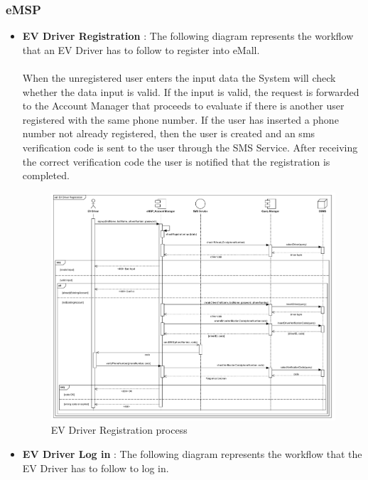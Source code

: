 \subsubsection{eMSP}
\begin{itemize}
    \item \textbf{EV Driver Registration} : The following diagram represents the workflow that an EV Driver has to follow to register into eMall.\\
          \\When the unregistered user enters the input data the System will check whether the data input is valid. If the input is valid,
          the request is forwarded to the Account Manager that proceeds to evaluate if there is another user registered with
          the same phone number. If the user has inserted a phone number not already registered, then the user is created and an sms verification
          code is sent to the user through the SMS Service. After receiving the correct verification code the user is notified that the
          registration is completed.
          \begin{figure}[H]
              \centering
              \includegraphics[scale=0.55]{src/runtimeView/eMSP_Registration.pdf}
              \caption{EV Driver Registration process}
          \end{figure}
          \pagebreak
    \item \textbf{EV Driver Log in} : The following diagram represents the workflow that the EV Driver has to follow to log in.\\

\end{itemize}
